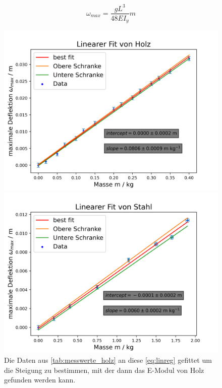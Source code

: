\documentclass[11pt,ngerman]{scrartcl}
\begin{document}
\begin{equation}
    \omega_{max} = \frac{g L^3}{48 E I_y} m  \label{eq:linreg}
\end{equation}


\begin{figure}[H]
    \centering
    \begin{minipage}[htbp]{\linewidth}
        \begin{minipage}[htbp]{.48\linewidth} %
            \includegraphics[width=\linewidth]{pics/fit/lin_reg_m_w_messreihe_1.png}
            \caption[Linearer-Fit Holz]{Die Daten aus \autoref{tab:messwerte_holz}
            an diese \autoref{eq:linreg} gefittet um die Steigung zu bestimmen, mit der dann das E-Modul von Holz gefunden werden kann.}
            \label{fig:linregholz}
        \end{minipage}
        \begin{minipage}[htbp]{.48\linewidth} %
            \includegraphics[width=\linewidth]{pics/fit/lin_reg_m_w_messreihe_2.png}

\end{minipage}
\end{minipage}
\end{figure}
\end{document}
